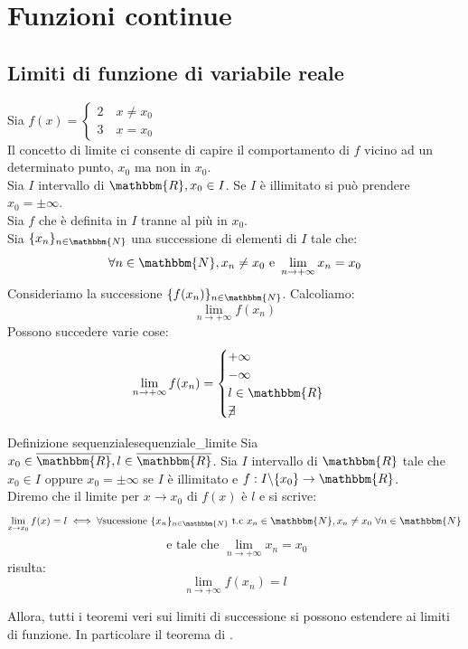 \documentclass[12pt]{report}
\newcounter{definition}
\newcommand{\namerefl}[1]{%
	\bgroup
	\let\nmu\MakeLowercase
	\nameref{#1}\egroup}
\newcommand{\nmu}{}
\begin{document}
	\chapter{Funzioni continue}
	\section{Limiti di funzione di variabile reale}
	Sia $f(x) = \begin{cases}
		2 \quad x \neq x_0 \\
		3 \quad x = x_0
	\end{cases}$ \\
	Il concetto di limite ci consente di capire il comportamento di $f$ vicino ad un determinato punto, $x_0$ ma non in $x_0$. \\
	Sia $I$ intervallo di $\mathbbm{R}, x_0 \in I$. Se $I$ è illimitato si può prendere $x_0 = \pm\infty$. \\
	Sia $f$ che è definita in $I$ tranne al più in $x_0$. \\
	Sia $\{x_n\}_{n \in \mathbbm{N}}$ una successione di elementi di $I$ tale che:
	\[
	\forall n \in \mathbbm{N}, x_n \neq x_0 \text{ e } \lim_{n \to +\infty}x_n = x_0
	\]
	Consideriamo la successione $\{f(x_n)\}_{n \in \mathbbm{N}}$. Calcoliamo:
	\[
	\lim_{n \to +\infty}f(x_n)
	\]
	Possono succedere varie cose:
	\[
	\lim_{n \to +\infty}f(x_n) = \begin{cases}
		+\infty \\
		-\infty \\
		l \in \mathbbm{R} \\
		\centernot{\exists}
	\end{cases}
	\]
	\begin{definition}{\nmu Definizione sequenziale}{sequenziale_limite}
		Sia $x_0 \in \overline{\mathbbm{R}}, l \in \overline{\mathbbm{R}}$. Sia $I$ intervallo di $\mathbbm{R}$ tale che $x_0 \in I$ oppure $x_0 = \pm\infty$ se $I$ è illimitato e $f:I\backslash\{x_0\} \to \mathbbm{R}$. \\
		Diremo che il limite per $x \to x_0$ di $f(x)$ è $l$ e si scrive:
		\[
		\lim_{x \to x_0}f(x) = l \iff \forall \text{sucessione $\{x_n\}_{n \in \mathbbm{N}}$ t.c } x_n \in \mathbbm{N}, x_n \neq x_0 \ \forall n\in\mathbbm{N} \]
		\[
		\text{ e tale che } \lim_{n \to +\infty}x_n = x_0
		\]
		risulta:
		\[
		\lim_{n \to +\infty}f(x_n)=l
		\]
	\end{definition}
	Allora, tutti i teoremi veri sui limiti di successione si possono estendere ai limiti di funzione. In particolare il teorema di \namerefl{th:unicita_limite}. \\
\end{document}
